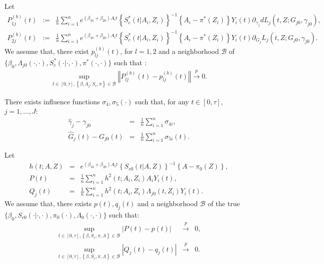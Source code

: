 \documentclass[11pt]{article}
\newcommand{\eqnn}{\begin{eqnarray*}}
\newcommand{\een}{\end{eqnarray*}}
\begin{document}
\begin{assumptionB}\label{if1nn}
Let
\eqnn
P^{(b)}_{1j}(t) &:=&  \frac{1}{n}\sum_{i=1}^n e^{ (\beta_{10}  + \beta_{20}) A_i t}\left\{S^{*}_c(t | A_i,Z_i)\right\}^{-1}\left\{A_i -\pi^{*}( Z_i)\right\}Y_i(t)\partial_{\gamma_j}dL_j(t, Z ; G_{j0}, \gamma_{j0}),\\
P^{(b)}_{2j}(t) &:=& \frac{1}{n}\sum_{i=1}^n e^{ (\beta_{10}  + \beta_{20}) A_i t}\left\{S^{*}_c(t | A_i,Z_i)\right\}^{-1}\left\{A_i -\pi^{*}( Z_i)\right\}Y_i(t)\partial_{G_j}L_j(t, Z ; G_{j0}, \gamma_{j0}).
\een
We assume that, there exist $p^{(b)}_{lj}(t)$, for $l=1,2$ and a neighborhood $\mathcal{B}$ of  \\$\{\beta_0,\Lambda_{j0}(\cdot,\cdot), S^{*}_{c}(\cdot| \cdot,\cdot), \pi^{*}(\cdot,\cdot)\}$ such that :
\eqnn
\sup_{t \in [0,\tau],  \left\{\beta,\Lambda_j, S_c, \pi \right\} \in \mathcal{B}} \left\Vert P^{(b)}_{lj}(t)-p^{(b)}_{lj}(t)\right\Vert \overset{p}{\rightarrow} 0.\een
\end{assumptionB}


\begin{assumptionB}\label{ifl}
There exists influence functions $\sigma_4,\sigma_5(\cdot)$ such that, for any $t \in [0,\tau]$, $j=1,\ldots,J$:
\eqnn
\hat \gamma_j-\gamma_{j0} &=& \frac{1}{n}\sum_{i=1}^n \sigma_{4i},\\
\hat G_j(t)-G_{j0}(t)& =& \frac{1}{n}\sum_{i=1}^n \sigma_{5i}(t).
\een
\end{assumptionB}


\begin{assumptionC}\label{ass2n}
Let
\eqnn
h(t; A,Z) &=& e^{ (\beta_{10}  + \beta_{20}) A_i t}\left\{S_{c0}(t | A,Z)\right\}^{-1}\left\{A -\pi_0( Z)\right\},\\
P(t) &=& \frac{1}{n}\sum_{i=1}^n h^2(t; A_i, Z_i) A_iY_i(t),\\
Q_j(t) &=& \frac{1}{n}\sum_{i=1}^n h^2(t; A_i, Z_i)\Lambda_{j0}(t, Z_i)Y_i(t).
\een
We assume that, there exists $p(t),q_j(t)$ and a neighborhood $\mathcal{B}$ of the true \\$\{\beta_0, S_{c0}(\cdot| \cdot,\cdot), \pi_0(\cdot),\Lambda_0(\cdot,\cdot)\}$ such that:
\eqnn
\sup_{t \in [0,\tau], \left\{\beta,S_c, \pi, \Lambda\right\} \in \mathcal{B}} \left|P(t)-p(t)\right|&\overset{p}{\rightarrow}& 0,\\
\sup_{t \in [0,\tau], \left\{\beta,S_c, \pi, \Lambda\right\} \in \mathcal{B}} \left|Q_j(t)-q_j(t)\right|&\overset{p}{\rightarrow}& 0.
\een
\end{assumptionC}
\end{document}
